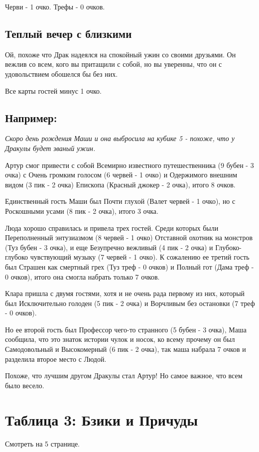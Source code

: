 \documentclass[twoside,twocolumn]{article}
\begin{document}
Черви - 1 очко. Трефы - 0 очков.

\subsection{Теплый вечер с близкими}
Ой, похоже что Драк надеялся на спокойный ужин со своими друзьями. Он вежлив со всем, кого вы притащили с собой, но вы уверенны, что он с удовольствием обошелся бы без них.

Все карты гостей минус 1 очко.

\subsection*{Например:}
{\itshape 
Скоро день рождения Маши и она выбросила на кубике 5 - похоже, что у Дракулы будет званый ужин.

Артур смог привести с собой Всемирно известного путешественника (9 бубен - 3 очка) с Очень громким голосом (6 червей - 1 очко) и Одержимого внешним видом (3 пик - 2 очка) Епископа (Красный джокер - 2 очка), итого 8 очков.

Единственный гость Маши был Почти глухой (Валет червей - 1 очко), но с Роскошными усами (8 пик - 2 очка), итого 3 очка.

Люда хорошо справилась и привела трех гостей. Среди которых были Переполненный энтузиазмом (8 червей - 1 очко) Отставной охотник на монстров (Туз бубен - 3 очка), и еще Безупречно вежливый (4 пик - 2 очка) и Глубоко-глубоко чувствующий музыку (7 червей - 1 очко). К сожалению ее третий гость был Страшен как смертный грех (Туз треф - 0 очков) и Полный гот (Дама треф - 0 очков), итого она смогла набрать только 7 очков.

Клара пришла с двумя гостями, хотя и не очень рада первому из них, который был Исключительно голоден (5 пик - 2 очка) и Ворчливым без остановки (7 треф - 0 очков).

Но ее второй гость был Профессор чего-то странного (5 бубен - 3 очка), Маша сообщила, что это знаток истории чулок и носок, ко всему прочему он был Самодовольный и Высокомерный (6 пик - 2 очка), так маша набрала 7 очков и разделила второе место с Людой.

Похоже, что лучшим другом Дракулы стал Артур! Но самое важное, что всем было весело.
}

\section*{Таблица 3: Бзики и Причуды}
Смотреть на 5 странице.
\end{document}
